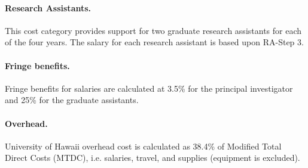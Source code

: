 \documentclass[11pt]{article}
\begin{document}
\paragraph*{Research Assistants.}  
This cost category provides support for two graduate research assistants
for each of the four years.  The salary for each research assistant is
based upon RA-Step 3.

\paragraph*{Fringe benefits.} 
Fringe benefits for salaries are calculated at 3.5\% for the principal
investigator and 25\% for the graduate assistants.

\paragraph*{Overhead.}  
University of Hawaii overhead cost is calculated as 38.4\% of Modified Total
Direct Costs (MTDC), i.e. salaries, travel, and supplies (equipment is
excluded).
\end{document}
